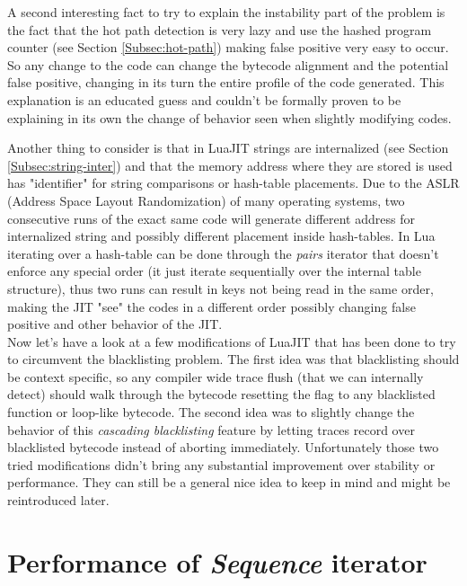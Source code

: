 A second interesting fact to try to explain the instability part of the problem
is the fact that the hot path detection is very lazy and use the hashed program
counter (see Section \ref{Subsec:hot-path}) making false positive very easy to
occur. So any change to the code can change the bytecode alignment and the
potential false positive, changing in its turn the entire profile of the code
generated. This explanation is an educated guess and couldn't be formally proven
to be explaining in its own the change of behavior seen when slightly modifying
codes.

Another thing to consider is that in LuaJIT strings are internalized (see
Section \ref{Subsec:string-inter}) and that the memory address where they are
stored is used has "identifier" for string comparisons or hash-table placements.
Due to the ASLR (Address Space Layout Randomization) of many operating systems,
two consecutive runs of the exact same code will generate different address for
internalized string and possibly different placement inside hash-tables. In Lua
iterating over a hash-table can be done through the \emph{pairs} iterator that
doesn't enforce any special order (it just iterate sequentially over the internal
table structure), thus two runs can result in keys not being read in the same order,
making the JIT "see" the codes in a different order possibly changing false positive
and other behavior of the JIT.\\

Now let's have a look at a few modifications of LuaJIT that has been done to try
to circumvent the blacklisting problem. The first idea was that blacklisting
should be context specific, so any compiler wide trace flush (that we can
internally detect) should walk through the bytecode resetting the flag to any
blacklisted function or loop-like bytecode. The second idea was to slightly
change the behavior of this \emph{cascading blacklisting} feature by letting
traces record over blacklisted bytecode instead of aborting immediately.
Unfortunately those two tried modifications didn't bring any substantial
improvement over stability or performance. They can still be a general nice idea
to keep in mind and might be reintroduced later.


\section{Performance of \emph{Sequence} iterator}
\label{Sec:MO-perf-iter}

